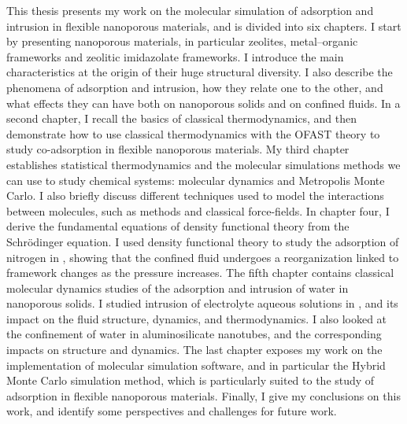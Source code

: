 This thesis presents my work on the molecular simulation of adsorption and
intrusion in flexible nanoporous materials, and is divided into six chapters. I
start by presenting nanoporous materials, in particular zeolites, metal--organic
frameworks and zeolitic imidazolate frameworks. I introduce the main
characteristics at the origin of their huge structural diversity. I also
describe the phenomena of adsorption and intrusion, how they relate one to the
other, and what effects they can have both on nanoporous solids and on confined
fluids. In a second chapter, I recall the basics of classical thermodynamics,
and then demonstrate how to use classical thermodynamics with the OFAST theory
to study co-adsorption in flexible nanoporous materials. My third chapter
establishes statistical thermodynamics and the molecular simulations methods we
can use to study chemical systems: molecular dynamics and Metropolis Monte
Carlo. I also briefly discuss different techniques used to model the
interactions between molecules, such as \abinitio methods and classical
force-fields. In chapter four, I derive the fundamental equations of density
functional theory from the Schrödinger equation. I used density functional
theory to study the adsorption of nitrogen in , showing that the confined
fluid undergoes a reorganization linked to framework changes as the pressure
increases. The fifth chapter contains classical molecular dynamics studies of
the adsorption and intrusion of water in nanoporous solids. I studied intrusion
of electrolyte aqueous solutions in , and its impact on the fluid
structure, dynamics, and thermodynamics. I also looked at the confinement of
water in aluminosilicate nanotubes, and the corresponding impacts on structure
and dynamics. The last chapter exposes my work on the implementation of
molecular simulation software, and in particular the Hybrid Monte Carlo
simulation method, which is particularly suited to the study of adsorption in
flexible nanoporous materials. Finally, I give my conclusions on this work, and
identify some perspectives and challenges for future work.
